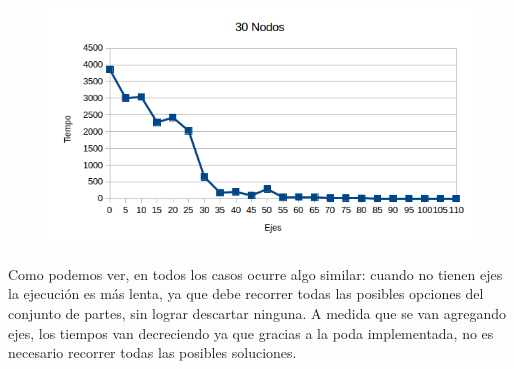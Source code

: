   \begin{figure}[h!]
   \begin{center}
 	\includegraphics[scale=0.7]{imagenes/exacto/30Nodos.png}
   \end{center}
 \end{figure}
 
Como podemos ver, en todos los casos ocurre algo similar: cuando no tienen ejes la ejecuci\'on es m\'as lenta, ya que debe recorrer todas las posibles opciones del conjunto de partes, sin lograr descartar ninguna.
A medida que se van agregando ejes, los tiempos van decreciendo ya que gracias a la poda implementada, no es necesario recorrer todas las posibles soluciones.\\

